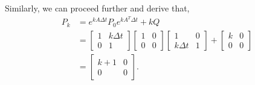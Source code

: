 Similarly, we can proceed further and derive that,
\begin{align*}
	P_k &= e^{kA\Delta t}P_0e^{kA^T\Delta t} + kQ\\
	&= \begin{bmatrix}1&k\Delta t\\0&1\end{bmatrix}\begin{bmatrix}1&0\\0&0\end{bmatrix}\begin{bmatrix}1&0\\k\Delta t&1\end{bmatrix}+\begin{bmatrix}k&0\\0&0\end{bmatrix}\\
	&= \begin{bmatrix}k+1&0\\0&0\end{bmatrix}.
\end{align*}